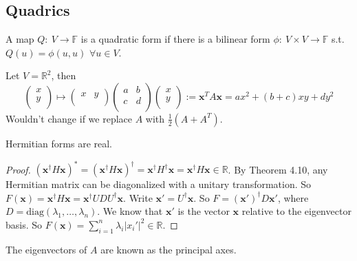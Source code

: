 \documentclass[a4paper]{article}
\begin{document}
\subsection{Quadrics}
\begin{defi}
A map $Q:~V\rightarrow\mathbb{F}$ is a quadratic form if there is a bilinear form $\phi:~V\times V\rightarrow\mathbb{F}$ s.t. $Q(u)=\phi(u,u)$ $\forall u\in V$.
\end{defi}
\begin{eg}
Let $V=\mathbb{R}^2$, then 
$$\begin{pmatrix}x\\y\\\end{pmatrix}\mapsto\begin{pmatrix}x&y\\\end{pmatrix}\begin{pmatrix}a&b\\c&d\\\end{pmatrix}\begin{pmatrix}x\\y\\\end{pmatrix}:=\mathbf{x}^TA\mathbf{x}=ax^2+(b+c)xy+dy^2$$
Wouldn't change if we replace $A$ with $\frac{1}{2}(A+A^T)$.
\end{eg}
\begin{thm}
  Hermitian forms are real.
\end{thm}
\begin{proof}
$(\mathbf{x}^\dagger H\mathbf{x})^* = (\mathbf{x}^\dagger H\mathbf{x})^\dagger = \mathbf{x}^\dagger H^\dagger\mathbf{x} = \mathbf{x}^\dagger H\mathbf{x}\in\mathbb{R}$. By Theorem 4.10, any Hermitian matrix can be diagonalized with a unitary transformation. So $F(\mathbf{x}) = \mathbf{x}^\dagger H\mathbf{x} = \mathbf{x}^\dagger UDU^\dagger \mathbf{x}$. Write $\mathbf{x}' = U^\dagger \mathbf{x}$. So $F = (\mathbf{x}')^\dagger D\mathbf{x}'$, where $D = \mathrm{diag}(\lambda_1,\dots,\lambda_n)$. We know that $\mathbf{x}'$ is the vector $\mathbf{x}$ relative to the eigenvector basis. So $F(\mathbf{x}) = \sum_{i = 1}^n \lambda_i |x_i'|^2\in\mathbb{R}$.
\end{proof}
\begin{defi}
The eigenvectors of $A$ are known as the principal axes.
\end{defi}
\end{document}
